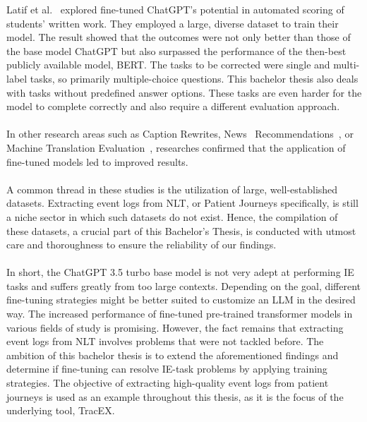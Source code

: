 \newpage
Latif et al.~\cite{latif_fine-tuning_2024} explored fine-tuned ChatGPT's potential in automated scoring of students' written work. They employed a large, diverse dataset to train their model. The result showed that the outcomes were not only better than those of the base model ChatGPT but also surpassed the performance of the then-best publicly available model, BERT. The tasks to be corrected were single and multi-label tasks, so primarily multiple-choice questions. This bachelor thesis also deals with tasks without predefined answer options. These tasks are even harder for the model to complete correctly and also require a different evaluation approach.\\\\
In other research areas such as Caption Rewrites, News~\cite{gladkoff_predictive_2023} Recommendations~\cite{li_exploring_2023}, or Machine Translation Evaluation~\cite{wang_mitigating_2023}, researches confirmed that the application of fine-tuned models led to improved results.\\\\
A common thread in these studies is the utilization of large, well-established datasets. Extracting event logs from NLT, or Patient Journeys specifically, is still a niche sector in which such datasets do not exist. Hence, the compilation of these datasets, a crucial part of this Bachelor's Thesis, is conducted with utmost care and thoroughness to ensure the reliability of our findings.\\\\
In short, the ChatGPT 3.5 turbo base model is not very adept at performing IE tasks and suffers greatly from too large contexts. Depending on the goal, different fine-tuning strategies might be better suited to customize an LLM in the desired way. The increased performance of fine-tuned pre-trained transformer models in various fields of study is promising. However, the fact remains that extracting event logs from NLT involves problems that were not tackled before. The ambition of this bachelor thesis is to extend the aforementioned findings and determine if fine-tuning can resolve IE-task problems by applying training strategies. The objective of extracting high-quality event logs from patient journeys is used as an example throughout this thesis, as it is the focus of the underlying tool, TracEX.